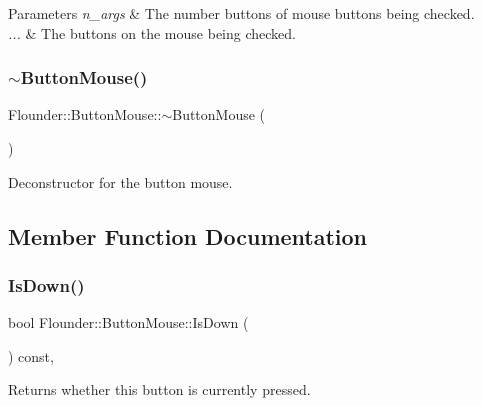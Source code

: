 \begin{DoxyParams}{Parameters}
{\em n\+\_\+args} & The number buttons of mouse buttons being checked. \\
\hline
{\em ...} & The buttons on the mouse being checked. \\
\hline
\end{DoxyParams}
\mbox{\label{class_flounder_1_1_button_mouse_a0097f606ff098d235026d85d013cbb29}} 
\subsubsection{\texorpdfstring{$\sim$\+Button\+Mouse()}{~ButtonMouse()}}
{\footnotesize\ttfamily Flounder\+::\+Button\+Mouse\+::$\sim$\+Button\+Mouse (\begin{DoxyParamCaption}{ }\end{DoxyParamCaption})}



Deconstructor for the button mouse. 



\subsection{Member Function Documentation}
\mbox{\label{class_flounder_1_1_button_mouse_aae2c553f4d3dabf948a5c6b6dd3b3c28}} 
\subsubsection{\texorpdfstring{Is\+Down()}{IsDown()}}
{\footnotesize\ttfamily bool Flounder\+::\+Button\+Mouse\+::\+Is\+Down (\begin{DoxyParamCaption}{ }\end{DoxyParamCaption}) const\hspace{0.3cm}{\ttfamily [override]}, {\ttfamily [virtual]}}



Returns whether this button is currently pressed. 

